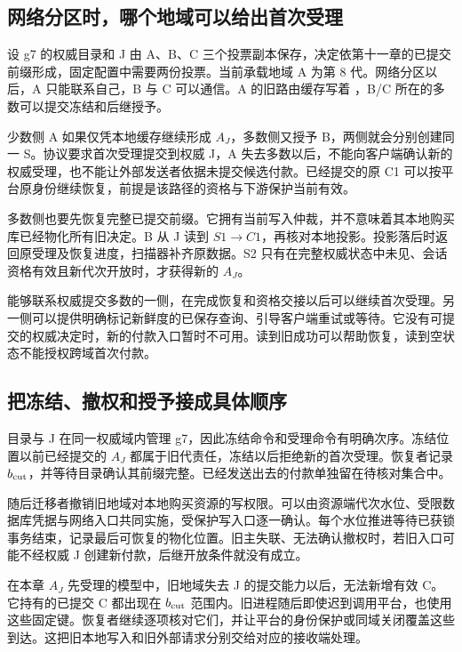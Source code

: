 \subsection*{网络分区时，哪个地域可以给出首次受理}

设 g7 的权威目录和 J 由 A、B、C 三个投票副本保存，决定依第十一章的已提交前缀形成，固定配置中需要两份投票。当前承载地域 A 为第 8 代。网络分区以后，A 只能联系自己，B 与 C 可以通信。A 的旧路由缓存写着 ，B/C 所在的多数可以提交冻结和后继授予。

少数侧 A 如果仅凭本地缓存继续形成 $A_J$，多数侧又授予 B，两侧就会分别创建同一 S。协议要求首次受理提交到权威 J，A 失去多数以后，不能向客户端确认新的权威受理，也不能让外部发送者依据未提交候选付款。已经提交的原 C1 可以按平台原身份继续恢复，前提是该路径的资格与下游保护当前有效。

多数侧也要先恢复完整已提交前缀。它拥有当前写入仲裁，并不意味着其本地购买库已经物化所有旧决定。B 从 J 读到 $S1\to C1$，再核对本地投影。投影落后时返回原受理及恢复进度，扫描器补齐原数据。S2 只有在完整权威状态中未见、会话资格有效且新代次开放时，才获得新的 $A_J$。


能够联系权威提交多数的一侧，在完成恢复和资格交接以后可以继续首次受理。另一侧可以提供明确标记新鲜度的已保存查询、引导客户端重试或等待。它没有可提交的权威决定时，新的付款入口暂时不可用。读到旧成功可以帮助恢复，读到空状态不能授权跨域首次付款。

\subsection*{把冻结、撤权和授予接成具体顺序}

目录与 J 在同一权威域内管理 g7，因此冻结命令和受理命令有明确次序。冻结位置以前已经提交的 $A_J$ 都属于旧代责任，冻结以后拒绝新的首次受理。恢复者记录 $b_{\rm cut}$，并等待目录确认其前缀完整。已经发送出去的付款单独留在待核对集合中。

随后迁移者撤销旧地域对本地购买资源的写权限。可以由资源端代次水位、受限数据库凭据与网络入口共同实施，受保护写入口逐一确认。每个水位推进等待已获锁事务结束，记录最后可恢复的物化位置。旧主失联、无法确认撤权时，若旧入口可能不经权威 J 创建新付款，后继开放条件就没有成立。

在本章 $A_J$ 先受理的模型中，旧地域失去 J 的提交能力以后，无法新增有效 C。它持有的已提交 C 都出现在 $b_{\rm cut}$ 范围内。旧进程随后即使迟到调用平台，也使用这些固定键。恢复者继续逐项核对它们，并让平台的身份保护或同域关闭覆盖这些到达。这把旧本地写入和旧外部请求分别交给对应的接收端处理。

